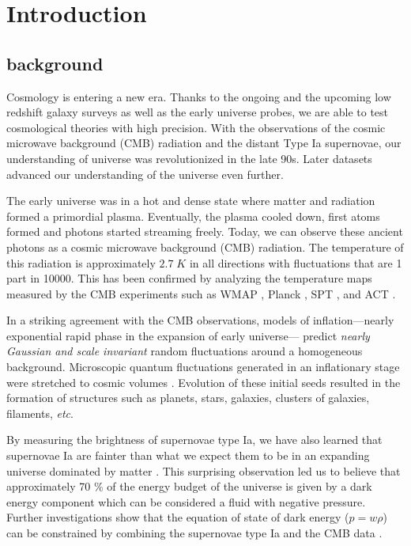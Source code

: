 \chapter*{Introduction}

\section{background}

Cosmology is entering a new era. Thanks to the ongoing and 
the upcoming low redshift galaxy surveys as well as the early universe probes, 
we are able to test cosmological theories with high precision.
With the observations of the cosmic microwave background (CMB) radiation 
and the distant Type Ia supernovae, our understanding of universe was 
revolutionized in the late 90s. Later datasets advanced our understanding 
of the universe even further.

The early universe was in a hot and dense state where 
matter and radiation formed a primordial plasma. Eventually, the 
plasma cooled down, first atoms formed and photons started streaming freely.  
Today, we can observe these ancient photons as a cosmic microwave background (CMB) radiation. 
The temperature of this radiation is approximately $2.7 \; K$ in all directions with 
fluctuations that are 1 part in 10000. This has been confirmed by analyzing the temperature maps measured 
by the CMB experiments such as WMAP \citep{bennet2013}, Planck \citep{planckII}, 
SPT \citep{george2015}, and ACT \citep{das2014}.  

In a striking agreement with the CMB observations, models of inflation---nearly 
exponential rapid phase in the expansion of early universe--- 
predict \emph{nearly Gaussian and scale invariant} random fluctuations around a homogeneous 
background. Microscopic quantum fluctuations generated in an inflationary 
stage were stretched to cosmic volumes \citep{Guth81,Linde1982,mukhanov1992}. 
Evolution of these initial seeds resulted in the formation of structures such as planets, stars, galaxies, 
clusters of galaxies, filaments, \emph{etc}.

By measuring the brightness of supernovae type Ia, we have also learned 
that supernovae Ia are fainter than what we expect them to be in an 
expanding universe dominated by matter \citep{Riess:1998aa,Schmidt1998,Perlmutter1999,conley2011}. 
This surprising observation led us to believe that approximately 70 $\%$ of 
the energy budget of the universe is given by a dark energy component which 
can be considered a fluid with negative pressure. Further investigations show 
that the equation of state of dark energy ($p = w\rho$) can be constrained 
by combining the supernovae type Ia and the CMB data \citep{Efstathiou1999,betoule2014}.

